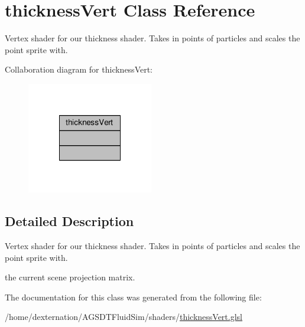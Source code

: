 \hypertarget{classthickness_vert}{\section{thickness\-Vert Class Reference}
\label{classthickness_vert}
}


Vertex shader for our thickness shader. Takes in points of particles and scales the point sprite with.  




Collaboration diagram for thickness\-Vert\-:\nopagebreak
\begin{figure}[H]
\begin{center}
\leavevmode
\includegraphics[width=156pt]{classthickness_vert__coll__graph}
\end{center}
\end{figure}


\subsection{Detailed Description}
Vertex shader for our thickness shader. Takes in points of particles and scales the point sprite with. 

the current scene projection matrix. 

The documentation for this class was generated from the following file\-:\begin{DoxyCompactItemize}
\item 
/home/dexternation/\-A\-G\-S\-D\-T\-Fluid\-Sim/shaders/\hyperlink{thickness_vert_8glsl}{thickness\-Vert.\-glsl}\end{DoxyCompactItemize}

